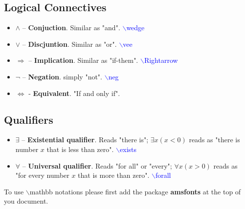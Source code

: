 \documentclass[12pt]{article}
\begin{document}
\subsection*{Logical Connectives}
\begin{itemize}
    \item $\wedge$ -- \textbf{Conjuction}. Similar as "and". \textcolor{blue} {$\backslash$wedge}
    \item $\vee$ -- \textbf{Discjuntion}. Similar as "or". \textcolor{blue} {$\backslash$vee}
    \item $\Rightarrow$ -- \textbf{Implication}. Similar as "if-them". \textcolor{blue} {$\backslash$Rightarrow}
    \item $\neg$ -- \textbf{Negation}. simply "not". \textcolor{blue} {$\backslash$neg}
    \item $\iff$ - \textbf{Equivalent}. "If and only if".
\end{itemize}

\subsection*{Qualifiers}
\begin{itemize}
    \item $\exists$ -- \textbf{Existential qualifier}. Reads "there is"; $\exists x(x<0)$ reads as "there is number $x$ that is less than zero". \textcolor{blue} {$\backslash$exists}
    \item $\forall$ -- \textbf{Universal qualifier}. Reads "for all" or "every"; $\forall x(x>0)$ reads as "for every number $x$ that is more than zero". \textcolor{blue} {$\backslash$forall}
\end{itemize}



To use {$\backslash$mathbb} notations please first add the package \textbf{amsfonts} at the top of you document.
\end{document}
